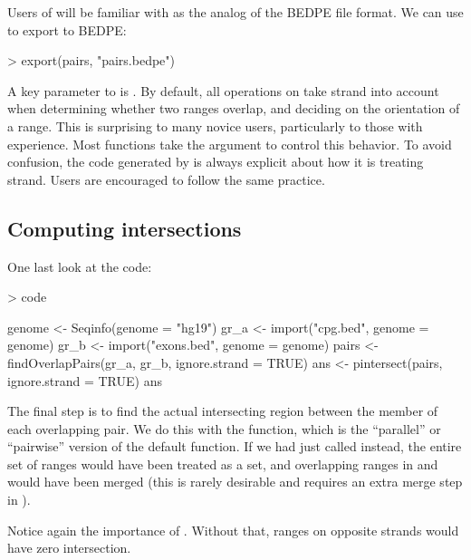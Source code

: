 \documentclass[10pt]{article}
\begin{document}
Users of  will be familiar with  as
the analog of the BEDPE file format. We can use 
to export  to BEDPE:
\begin{Schunk}
\begin{Sinput}
> export(pairs, "pairs.bedpe")
\end{Sinput}
\end{Schunk}

A key parameter to  is
. By default, all operations on
 take strand into account when determining whether two
ranges overlap, and deciding on the orientation of a range. This is
surprising to many novice users, particularly to those with
 experience. Most functions take the
 argument to control this behavior. To avoid
confusion, the code generated by  is always
explicit about how it is treating strand. Users are encouraged to
follow the same practice.

\subsection{Computing intersections}
One last look at the code:
\begin{Schunk}
\begin{Sinput}
> code
\end{Sinput}
\begin{Soutput}
{
    genome <- Seqinfo(genome = "hg19")
    gr_a <- import("cpg.bed", genome = genome)
    gr_b <- import("exons.bed", genome = genome)
    pairs <- findOverlapPairs(gr_a, gr_b, ignore.strand = TRUE)
    ans <- pintersect(pairs, ignore.strand = TRUE)
    ans
}
\end{Soutput}
\end{Schunk}

The final step is to find the actual intersecting region between the
member of each overlapping pair. We do this with the
 function, which is the ``parallel'' or
``pairwise'' version of the default  function. If
we had just called  instead, the entire
set of ranges would have been treated as a set, and overlapping ranges
in  and  would have been merged (this is
rarely desirable and requires an extra merge step in
).

Notice again the importance of . Without
that, ranges on opposite strands would have zero intersection.
\end{document}
